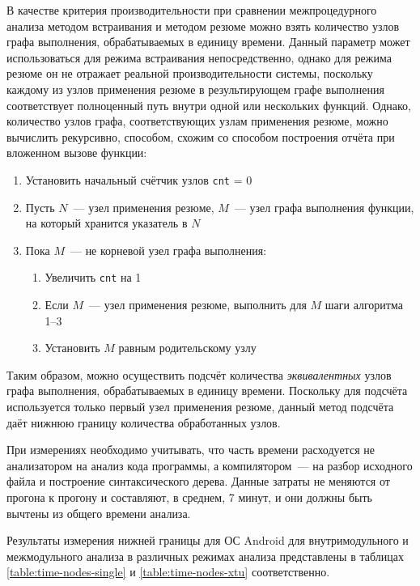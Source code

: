 В качестве критерия производительности при сравнении межпроцедурного анализа методом встраивания и методом резюме можно взять количество узлов графа выполнения, обрабатываемых в единицу времени. Данный параметр может использоваться для режима встраивания непосредственно, однако для режима резюме он не отражает реальной производительности системы, поскольку каждому из узлов применения резюме в результирующем графе выполнения соответствует полноценный путь внутри одной или нескольких функций. Однако, количество узлов графа, соответствующих узлам применения резюме, можно вычислить рекурсивно, способом, схожим со способом построения отчёта при вложенном вызове функции: 

\begin{enumerate}
 \item Установить начальный счётчик узлов \texttt{cnt} = 0
 \item Пусть $N$~--- узел применения резюме, $M$~--- узел графа выполнения функции, на который хранится указатель в $N$
 \item Пока $M$~--- не корневой узел графа выполнения:
  \begin{enumerate}
   \item Увеличить \texttt{cnt} на 1
   \item Если $M$~--- узел применения резюме, выполнить для $M$ шаги алгоритма 1--3
   \item Установить $M$ равным родительскому узлу
  \end{enumerate}
\end{enumerate}

Таким образом, можно осуществить подсчёт количества \textit{эквивалентных} узлов графа выполнения, обрабатываемых в единицу времени. Поскольку для подсчёта используется только первый узел применения резюме, данный метод подсчёта даёт нижнюю границу количества обработанных узлов.

При измерениях необходимо учитывать, что часть времени расходуется не анализатором на анализ кода программы, а компилятором~--- на разбор исходного файла и построение синтаксического дерева. Данные затраты не меняются от прогона к прогону и составляют, в среднем, 7 минут, и они должны быть вычтены из общего времени анализа.

Результаты измерения нижней границы для ОС Android для внутримодульного и межмодульного анализа в различных режимах анализа представлены в таблицах \ref{table:time-nodes-single} и \ref{table:time-nodes-xtu} соответственно.

